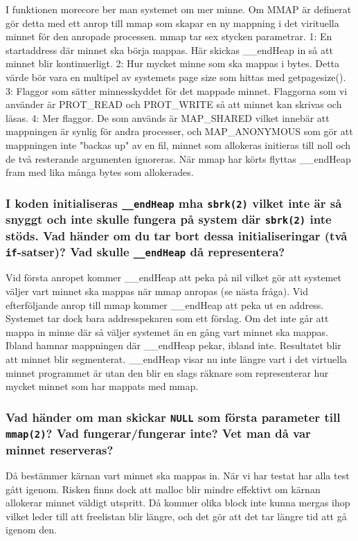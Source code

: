 \documentclass[a4paper]{article}
\begin{document}
I funktionen morecore ber man systemet om mer minne. Om MMAP är definerat gör detta med ett anrop till mmap som skapar en ny mappning i det virituella minnet för den anropade processen. mmap tar sex stycken parametrar. 1: En startaddress där minnet ska börja mappas. Här skickas __endHeap in så att minnet blir kontinuerligt. 2: Hur mycket minne som ska mappas i bytes. Detta värde bör vara en multipel av systemets page size som hittas med getpagesize(). 3: Flaggor som sätter minnesskyddet för det mappade minnet. Flaggorna som vi använder är PROT_READ och PROT_WRITE så att minnet kan skrivas och läsas. 4: Mer flaggor. De som används är MAP_SHARED vilket innebär att mappningen är synlig för andra processer, och MAP_ANONYMOUS som gör att mappningen inte "backas up" av en fil, minnet som allokeras initieras till noll och de två resterande argumenten ignoreras. När mmap har körts flyttas __endHeap fram med lika många bytes som allokerades.

\subsubsection*{I koden initialiseras \texttt{\_\_endHeap} mha \texttt{sbrk(2)} vilket inte är så snyggt och inte skulle fungera på system där \texttt{sbrk(2)} inte stöds. Vad händer om du tar bort dessa initialiseringar (två \texttt{if}-satser)? Vad skulle \texttt{\_\_endHeap} då representera?}
Vid första anropet kommer __endHeap att peka på nil vilket gör att systemet väljer vart minnet ska mappas när mmap anropas (se nästa fråga). Vid efterföljande anrop till mmap kommer __endHeap att peka ut en address. Systemet tar dock bara addresspekaren som ett förslag. Om det inte går att mappa in minne där så väljer systemet än en gång vart minnet ska mappas. Ibland hamnar mappningen där __endHeap pekar, ibland inte. Resultatet blir att minnet blir segmenterat. __endHeap visar nu inte längre vart i det virtuella minnet programmet är utan den blir en slags räknare som representerar hur mycket minnet som har mappats med mmap.

\subsubsection*{Vad händer om man skickar \texttt{NULL} som första parameter till \texttt{mmap(2)}? Vad fungerar/fungerar inte? Vet man då var minnet reserveras?}
Då bestämmer kärnan vart minnet ska mappas in. När vi har testat har alla test gått igenom. Risken finns dock att malloc blir mindre effektivt om kärnan allokerar minnet väldigt utspritt. Då kommer olika block inte kunna mergas ihop vilket leder till att freelistan blir längre, och det gör att det tar längre tid att gå igenom den.
\end{document}
